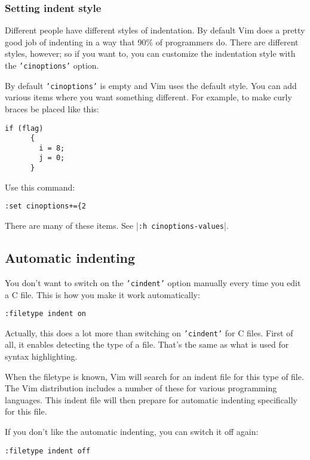 \subsubsection{Setting indent style}
Different people have different styles of indentation.
By default Vim does a pretty good job of indenting in a way that 90\% of programmers do.
There are different styles, however; so if you want to, you can customize the indentation style with the \texttt{'cinoptions'} option.

By default \texttt{'cinoptions'} is empty and Vim uses the default style.
You can add various items where you want something different.
For example, to make curly braces be placed like this:

\begin{Verbatim}[samepage=true]
    if (flag)
      {
        i = 8;
        j = 0;
      }
\end{Verbatim}

Use this command:

\begin{Verbatim}[samepage=true]
 :set cinoptions+={2
\end{Verbatim}

There are many of these items.  See |\texttt{:h cinoptions-values}|.
\subsection{Automatic indenting}
You don't want to switch on the \texttt{'cindent'} option manually every time you edit a C file.
This is how you make it work automatically:

\begin{Verbatim}[samepage=true]
 :filetype indent on
\end{Verbatim}

Actually, this does a lot more than switching on \texttt{'cindent'} for C files.
First of all, it enables detecting the type of a file.
That's the same as what is used for syntax highlighting.

When the filetype is known, Vim will search for an indent file for this type of file.
The Vim distribution includes a number of these for various programming languages.
This indent file will then prepare for automatic indenting specifically for this file.

If you don't like the automatic indenting, you can switch it off again:

\begin{Verbatim}[samepage=true]
 :filetype indent off
\end{Verbatim}

